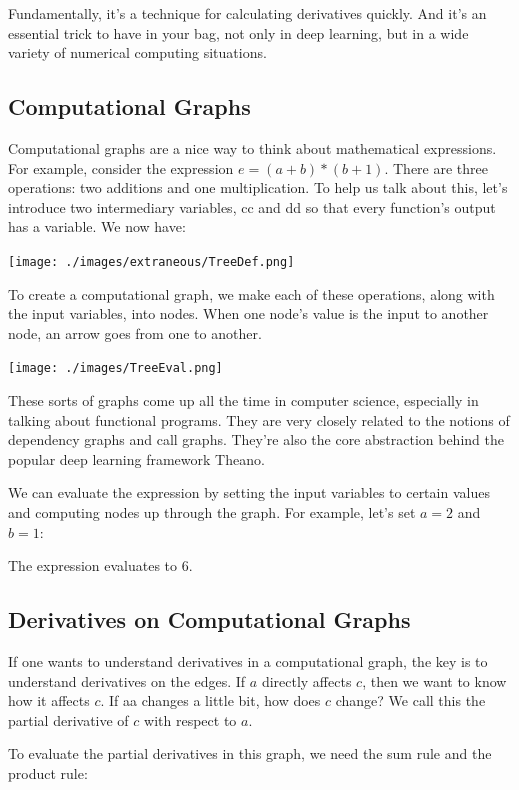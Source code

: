 \documentclass[a4paper,12pt]{report}%
\begin{document}
Fundamentally, it’s a technique for calculating derivatives quickly. And it’s an essential trick to have in your bag, not only in deep learning, but in a wide variety of numerical computing situations.

\subsection{Computational Graphs}
Computational graphs are a nice way to think about mathematical expressions. For example, consider the expression $e=(a+b)*(b+1)$. There are three operations: two additions and one multiplication. To help us talk about this, let’s introduce two intermediary variables, cc and dd so that every function’s output has a variable. We now have:
\begin{center}
 \texttt{[image: ./images/extraneous/TreeDef.png]}
\end{center}

To create a computational graph, we make each of these operations, along with the input variables, into nodes. When one node’s value is the input to another node, an arrow goes from one to another.
\begin{center}
 \texttt{[image: ./images/TreeEval.png]}
\end{center}

These sorts of graphs come up all the time in computer science, especially in talking about functional programs. They are very closely related to the notions of dependency graphs and call graphs. They’re also the core abstraction behind the popular deep learning framework Theano.

We can evaluate the expression by setting the input variables to certain values and computing nodes up through the graph. For example, let’s set $a=2$ and $b=1$:

The expression evaluates to 6.

\subsection{Derivatives on Computational Graphs}

If one wants to understand derivatives in a computational graph, the key is to understand derivatives on the edges. If $a$ directly affects $c$, then we want to know how it affects $c$. If aa changes a little bit, how does $c$ change? We call this the partial derivative of $c$ with respect to $a$.

To evaluate the partial derivatives in this graph, we need the sum rule and the product rule:
\end{document}
